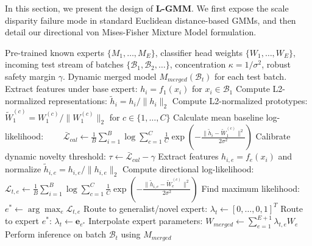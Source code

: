 \documentclass{article}
\theoremstyle{plain}
\theoremstyle{definition}
\theoremstyle{remark}
\begin{document}
In this section, we present the design of \textbf{L-GMM}. We first expose the scale disparity failure mode in standard Euclidean distance-based GMMs, and then detail our directional von Mises-Fisher Mixture Model formulation.

\begin{algorithm}[!t]
   \caption{L-GMM: Latent von Mises-Fisher GMM Test-Time Routing}
   \label{alg:lgmm}
   \footnotesize
\begin{algorithmic}[1]
    Pre-trained known experts $\{M_1, \dots, M_E\}$, classifier head weights $\{W_1, \dots, W_E\}$, incoming test stream of batches $\{\mathcal{B}_1, \mathcal{B}_2, \dots\}$, concentration $\kappa = 1/\sigma^2$, robust safety margin $\gamma$.
    Dynamic merged model $M_{merged}(\mathcal{B}_t)$ for each test batch.
   \STATE {}
   \STATE Extract features under base expert: $h_i = f_1(x_i)$ for $x_i \in \mathcal{B}_1$
   \STATE Compute L2-normalized representations: $\tilde{h}_i = h_i / \|h_i\|_2$
   \STATE Compute L2-normalized prototypes: $\tilde{W}_1^{(c)} = W_1^{(c)} / \|W_1^{(c)}\|_2$ for $c \in \{1,\dots,C\}$
   \STATE Calculate mean baseline log-likelihood:
   \STATE \ \ \ \ $\bar{\mathcal{L}}_{cal} \leftarrow \frac{1}{B} \sum_{i=1}^B \log \sum_{c=1}^C \frac{1}{C} \exp\left(-\frac{\|\tilde{h}_i - \tilde{W}_1^{(c)}\|^2}{2\sigma^2}\right)$
   \STATE Calibrate dynamic novelty threshold: $\tau \leftarrow \bar{\mathcal{L}}_{cal} - \gamma$
   \STATE {}
           \STATE Extract features $h_{i,e} = f_e(x_i)$ and normalize $\tilde{h}_{i,e} = h_{i,e} / \|h_{i,e}\|_2$
           \STATE Compute directional log-likelihood:
           \STATE \ \ \ \ $\mathcal{L}_{t,e} \leftarrow \frac{1}{B}\sum_{i=1}^B \log \sum_{c=1}^C \frac{1}{C}\exp\left(-\frac{\|\tilde{h}_{i,e} - \tilde{W}_e^{(c)}\|^2}{2\sigma^2}\right)$
       \ENDFOR
       \STATE Find maximum likelihood: $e^* \leftarrow \arg\max_e \mathcal{L}_{t,e}$
           \STATE {}
           \STATE Route to generalist/novel expert: $\lambda_t \leftarrow [0, \dots, 0, 1]^T$
       \ELSE
           \STATE {}
           \STATE Route to expert $e^*$: $\lambda_t \leftarrow \mathbf{e}_{e^*}$
       \ENDIF
       \STATE Interpolate expert parameters: $W_{merged} \leftarrow \sum_{e=1}^{E+1} \lambda_{t,e} W_e$
       \STATE Perform inference on batch $\mathcal{B}_t$ using $M_{merged}$
   \ENDFOR
\end{algorithmic}
\end{algorithm}
\end{document}
